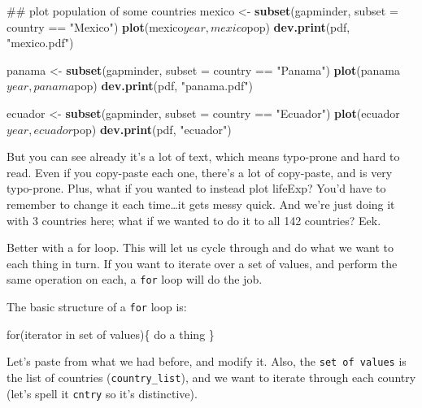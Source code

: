 \documentclass[]{book}
\newenvironment{Shaded}{\begin{snugshade}}{\end{snugshade}}
\newcommand{\KeywordTok}[1]{\textcolor[rgb]{0.13,0.29,0.53}{\textbf{{#1}}}}
\newcommand{\DataTypeTok}[1]{\textcolor[rgb]{0.13,0.29,0.53}{{#1}}}
\newcommand{\StringTok}[1]{\textcolor[rgb]{0.31,0.60,0.02}{{#1}}}
\newcommand{\NormalTok}[1]{{#1}}
\theoremstyle{definition}
\theoremstyle{definition}
\theoremstyle{definition}
\theoremstyle{remark}
\begin{document}
\begin{Shaded}
\begin{Highlighting}[]
\NormalTok{## plot population of some countries}
\NormalTok{mexico <-}\StringTok{ }\KeywordTok{subset}\NormalTok{(gapminder, }\DataTypeTok{subset =} \NormalTok{country ==}\StringTok{ "Mexico"}\NormalTok{)}
\KeywordTok{plot}\NormalTok{(mexico$year, mexico$pop)}
\KeywordTok{dev.print}\NormalTok{(pdf, }\StringTok{"mexico.pdf"}\NormalTok{)}

\NormalTok{panama <-}\StringTok{ }\KeywordTok{subset}\NormalTok{(gapminder, }\DataTypeTok{subset =} \NormalTok{country ==}\StringTok{ "Panama"}\NormalTok{) }
\KeywordTok{plot}\NormalTok{(panama$year, panama$pop)}
\KeywordTok{dev.print}\NormalTok{(pdf, }\StringTok{"panama.pdf"}\NormalTok{)}

\NormalTok{ecuador <-}\StringTok{ }\KeywordTok{subset}\NormalTok{(gapminder, }\DataTypeTok{subset =} \NormalTok{country ==}\StringTok{ "Ecuador"}\NormalTok{)}
\KeywordTok{plot}\NormalTok{(ecuador$year, ecuador$pop)}
\KeywordTok{dev.print}\NormalTok{(pdf, }\StringTok{"ecuador"}\NormalTok{)}
\end{Highlighting}
\end{Shaded}

But you can see already it's a lot of text, which means typo-prone and
hard to read. Even if you copy-paste each one, there's a lot of
copy-paste, and is very typo-prone. Plus, what if you wanted to instead
plot lifeExp? You'd have to remember to change it each time\ldots{}it
gets messy quick. And we're just doing it with 3 countries here; what if
we wanted to do it to all 142 countries? Eek.

Better with a for loop. This will let us cycle through and do what we
want to each thing in turn. If you want to iterate over a set of values,
and perform the same operation on each, a \texttt{for} loop will do the
job.

The basic structure of a \texttt{for} loop is:

\begin{Shaded}
\begin{Highlighting}[]
\NormalTok{for(iterator in set of values)\{}
  \NormalTok{do a thing}
\NormalTok{\}}
\end{Highlighting}
\end{Shaded}

Let's paste from what we had before, and modify it. Also, the
\texttt{set\ of\ values} is the list of countries
(\texttt{country\_list}), and we want to iterate through each country
(let's spell it \texttt{cntry} so it's distinctive).
\end{document}
